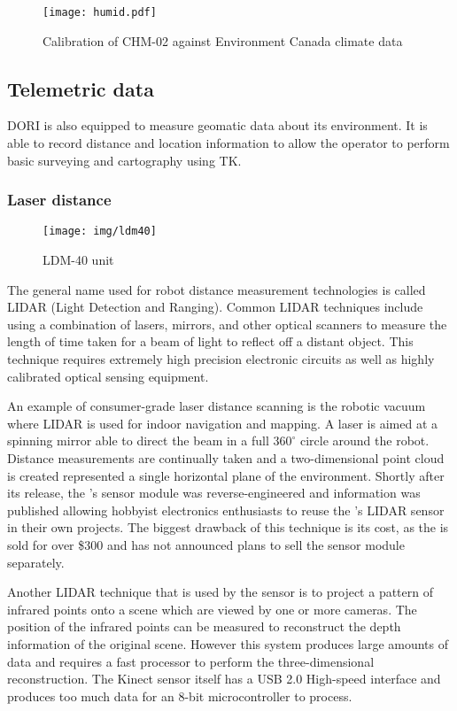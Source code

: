 \begin{figure}[h]
    \scriptsize
    \centering
    \texttt{[image: humid.pdf]}
    \caption{Calibration of CHM-02 against Environment Canada climate data~\cite{humidity}}
\end{figure}

\subsection{Telemetric data}
    DORI is also equipped to measure geomatic data about its environment. It is able to record distance and location information to allow the operator to perform basic surveying and cartography using \textsc{TK}.

\newpage
    \subsubsection*{Laser distance}
    \begin{wrapfigure}{l}{0.2\textwidth}
        \centering
        \texttt{[image: img/ldm40]}
        \caption*{LDM-40 unit}
    \end{wrapfigure}
    The general name used for robot distance measurement technologies is called LIDAR (Light Detection and Ranging). Common LIDAR techniques include using a combination of lasers, mirrors, and other optical scanners to measure the length of time taken for a beam of light to reflect off a distant object. This technique requires extremely high precision electronic circuits as well as highly calibrated optical sensing equipment.

    An example of consumer-grade laser distance scanning is the  robotic vacuum where LIDAR is used for indoor navigation and mapping. A laser is aimed at a spinning mirror able to direct the beam in a full $360^\circ$ circle around the robot. Distance measurements are continually taken and a two-dimensional point cloud is created represented a single horizontal plane of the environment. Shortly after its release, the 's sensor module was reverse-engineered and information was published allowing hobbyist electronics enthusiasts to reuse the 's LIDAR sensor in their own projects. The biggest drawback of this technique is its cost, as the  is sold for over \$300 and  has not announced plans to sell the sensor module separately.

    Another LIDAR technique that is used by the  sensor is to project a pattern of infrared points onto a scene which are viewed by one or more cameras. The position of the infrared points can be measured to reconstruct the depth information of the original scene. However this system produces large amounts of data and requires a fast processor to perform the three-dimensional reconstruction. The Kinect sensor itself has a USB 2.0 High-speed interface and produces too much data for an 8-bit microcontroller to process.

